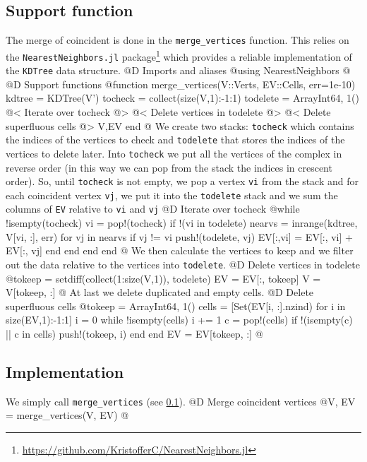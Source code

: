 \documentclass[10pt,oneside]{article}
\begin{document}
\subsection{Support function}
\label{sec:merge_vertices}
The merge of coincident is done in the \texttt{merge\_vertices}
function. This relies on the \texttt{NearestNeighbors.jl}
package\footnote{\url{https://github.com/KristofferC/NearestNeighbors.jl}}
which provides a reliable implementation of the \texttt{KDTree} data structure.
@D Imports and aliases
@{using NearestNeighbors
@}
@D Support functions
@{function merge_vertices(V::Verts, EV::Cells, err=1e-10)
    kdtree = KDTree(V')
    tocheck = collect(size(V,1):-1:1)
    todelete = Array{Int64, 1}()
    @< Iterate over tocheck @>
    @< Delete vertices in todelete @>
    @< Delete superfluous cells @>
    V,EV
end
@}
We create two stacks: \texttt{tocheck} which contains the indices of the vertices
to check and \texttt{todelete} that stores the indices of the vertices to delete later.
Into \texttt{tocheck} we put all the vertices of the complex in reverse order (in
this way we can pop from the stack the indices in crescent order). So, until \texttt{tocheck} is not empty,
we pop a vertex \texttt{vi} from the stack and for each coincident vertex \texttt{vj}, we put it 
into the \texttt{todelete} stack and we sum the columns of \texttt{EV} relative to \texttt{vi} and \texttt{vj}
@D Iterate over tocheck 
@{while !isempty(tocheck)
    vi = pop!(tocheck)
    if !(vi in todelete)
        nearvs = inrange(kdtree, V[vi, :], err)
        for vj in nearvs
            if vj != vi
                push!(todelete, vj)
                EV[:,vi] = EV[:, vi] + EV[:, vj]
            end
        end
    end
end
@}
We then calculate the vertices to keep and we filter out
the data relative to the vertices into \texttt{todelete}.
@D Delete vertices in todelete
@{tokeep = setdiff(collect(1:size(V,1)), todelete)
EV = EV[:, tokeep]
V = V[tokeep, :]
@}
At last we delete duplicated and empty cells.
@D Delete superfluous cells
@{tokeep = Array{Int64, 1}()
cells = [Set(EV[i, :].nzind) for i in size(EV,1):-1:1]
i = 0
while !isempty(cells)
    i += 1
    c = pop!(cells)
    if !(isempty(c) || c in cells)
        push!(tokeep, i)
    end
end
EV = EV[tokeep, :]
@}
\subsection{Implementation}
We simply call \texttt{merge\_vertices} (see \ref{sec:merge_vertices}).
@D Merge coincident vertices
@{V, EV = merge_vertices(V, EV)
@}
\end{document}
